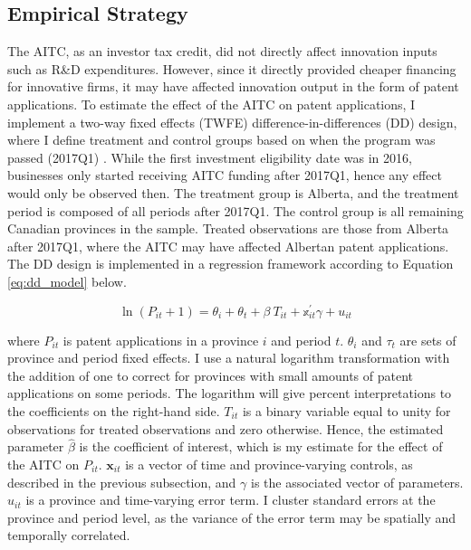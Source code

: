\documentclass[../main.tex]{subfiles}
\begin{document}
\subsection{Empirical Strategy}
The AITC, as an investor tax credit, did not directly affect innovation inputs such as R\&D expenditures. However, since it directly provided cheaper financing for innovative firms, it may have affected innovation output in the form of patent applications. To estimate the effect of the AITC on patent applications, I implement a two-way fixed effects (TWFE) difference-in-differences (DD) design, where I define treatment and control groups based on when the program was passed (2017Q1) \parencite{albertaeconomicdevelopmentandtrade17}. While the first investment eligibility date was in 2016, businesses only started receiving AITC funding after 2017Q1, hence any effect would only be observed then. The treatment group is Alberta, and the treatment period is composed of all periods after 2017Q1. The control group is all remaining Canadian provinces in the sample. Treated observations are those from Alberta after 2017Q1, where the AITC may have affected Albertan patent applications. The DD design is implemented in a regression framework according to Equation \ref{eq:dd_model} below.

\begin{equation}
    \label{eq:dd_model}
    \ln(P_{it} + 1) = \theta_i + \theta_t + \beta \ T_{it} + \mathbb{x}_{it}^{'} \gamma + u_{it}
\end{equation}

where $P_{it}$ is patent applications in a province $i$ and period $t$. $\theta_i$ and $\tau_t$ are sets of province and period fixed effects. I use a natural logarithm transformation with the addition of one to correct for provinces with small amounts of patent applications on some periods. The logarithm will give percent interpretations to the coefficients on the right-hand side. $T_{it}$ is a binary variable equal to unity for observations for treated observations and zero otherwise. Hence, the estimated parameter $\hat{\beta}$ is the coefficient of interest, which is my estimate for the effect of the AITC on $P_{it}$. $\mathbf{x}_{it}$ is a vector of time and province-varying controls, as described in the previous subsection, and $\gamma$ is the associated vector of parameters. $u_{it}$ is a province and time-varying error term. I cluster standard errors at the province and period level, as the variance of the error term may be spatially and temporally correlated.
\end{document}
